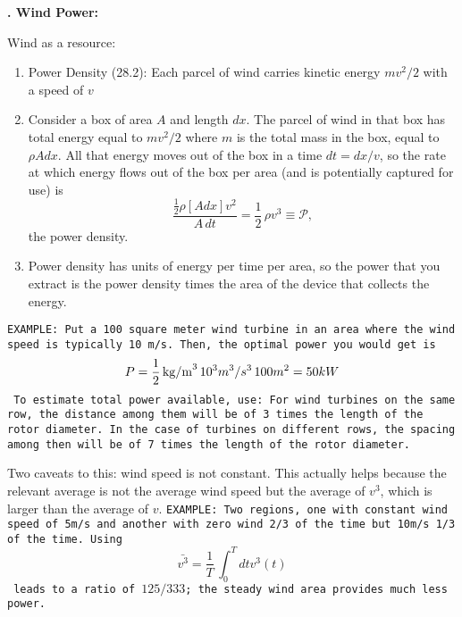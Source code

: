 \documentclass[11pt]{book}
\def\be{\begin{equation}}
\def\ee{\end{equation}}
\newcommand\example[1]{{\tt EXAMPLE: #1}}
\newcommand\bee{\begin{enumerate}}
\newcommand\eee{\end{enumerate}}
\newcounter{lectureno}
\newcounter{secno}
\newcommand\lsection[1]{
\addtocounter{secno}{1}
{\bf \arabic{lectureno}.\alph{secno} #1:}}
\begin{document}
\lsection{Wind Power}

Wind as a resource:
\bee
\item Power Density (28.2): Each parcel of wind carries kinetic energy $mv^2/2$ with a speed of $v$
\item Consider a box of area $A$ and length $dx$. The parcel of wind in that box has total energy equal to $mv^2/2$ where $m$ is the total mass in the box, equal to $\rho Adx$. All that energy moves out of the box in a time $dt=dx/v$, so the rate at which energy flows out of the box per area (and is potentially captured for use) is
\be
\frac{\frac12 \rho  [A dx] v^2}{A\,dt}= \frac12\,\rho v^3\equiv \mathcal{P},
\ee
the power density.
\item Power density has units of energy per time per area, so the power that you extract is the power density times the area of the device that collects the energy.
\eee
\example{Put a 100 square meter wind turbine in an area where the wind speed is typically 10 m/s. Then, the optimal power you would get is
\be
P = \frac12\,{\rm kg/m}^3\, 10^3 m^3/s^3\, 100 m^2 = 50 kW
\ee
To estimate total power available, use: For wind turbines on the same row, the distance among them will be of 3 times the length of the rotor diameter. In the case of turbines on different rows, the spacing among then will be of 7 times the length of the rotor diameter.
}


Two caveats to this: wind speed is not constant. This actually helps because the relevant average is not the average wind speed but the average of $v^3$, which is larger than the average of $v$.
\example{Two regions, one with constant wind speed of 5m/s and another with zero wind 2/3 of the time but 10m/s 1/3 of the time. Using
\be
\bar{v^3} = \frac1T\,\int_0^T dt v^3(t)\ee
leads to a ratio of $125/333$; the steady wind area provides much less power.}
\end{document}
